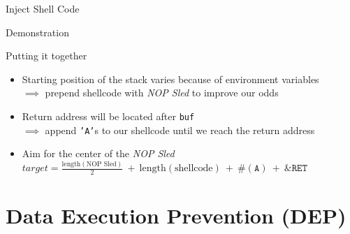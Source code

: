 \documentclass[beamer]{uibk}
\begin{document}
\begin{frame}{Inject Shell Code}
    \begin{center}
        \huge Demonstration
    \end{center}
\end{frame}

\begin{frame}[fragile]{Putting it together}
    \begin{itemize}
        \item Starting position of the stack varies because of environment
            variables\\
            \medskip
            $\implies$ prepend shellcode with \textit{NOP Sled} to improve our
            odds
        \bigskip
        \item Return address will be located after \texttt{buf}\\
            \medskip
            $\implies$ append \texttt{'A'}s to our shellcode until we reach the
            return address
        \bigskip
        \item Aim for the center of the \textit{NOP Sled}\\
            \medskip
            $\mathit{target} = \frac{\mathrm{length}(\text{NOP Sled})}{2}\ +\ \mathrm{length}(\text{shellcode})\ +\ \#(\texttt{A})\ +\ \texttt{\&RET}$
   \end{itemize}
   \begin{center}
       
   \end{center}
\end{frame}

\section{Data Execution Prevention (DEP)}
\end{document}

